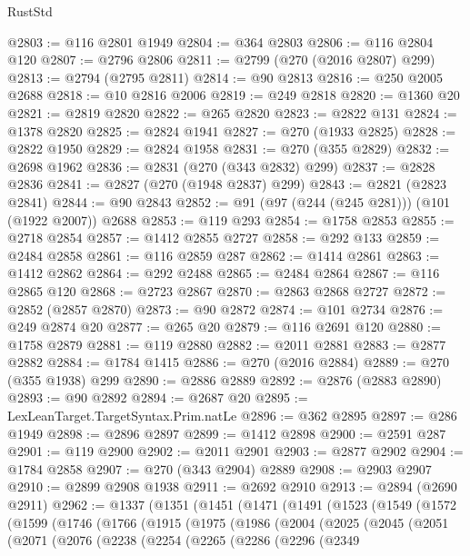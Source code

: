 \begin{lexlean}{RustStd}
\begin{coremodule}
@2803 := @116 @2801 @1949
@2804 := @364 @2803
@2806 := @116 @2804 @120
@2807 := @2796 @2806
@2811 := @2799 (@270 (@2016 @2807) @299)
@2813 := @2794 (@2795 @2811)
@2814 := @90 @2813
@2816 := @250 @2005 @2688
@2818 := @10 @2816 @2006
@2819 := @249 @2818
@2820 := @1360 @20
@2821 := @2819 @2820
@2822 := @265 @2820
@2823 := @2822 @131
@2824 := @1378 @2820
@2825 := @2824 @1941
@2827 := @270 (@1933 @2825)
@2828 := @2822 @1950
@2829 := @2824 @1958
@2831 := @270 (@355 @2829)
@2832 := @2698 @1962
@2836 := @2831 (@270 (@343 @2832) @299)
@2837 := @2828 @2836
@2841 := @2827 (@270 (@1948 @2837) @299)
@2843 := @2821 (@2823 @2841)
@2844 := @90 @2843
@2852 := @91 (@97 (@244 (@245 @281))) (@101 (@1922 @2007)) @2688
@2853 := @119 @293
@2854 := @1758 @2853
@2855 := @2718 @2854
@2857 := @1412 @2855 @2727
@2858 := @292 @133
@2859 := @2484 @2858
@2861 := @116 @2859 @287
@2862 := @1414 @2861
@2863 := @1412 @2862
@2864 := @292 @2488
@2865 := @2484 @2864
@2867 := @116 @2865 @120
@2868 := @2723 @2867
@2870 := @2863 @2868 @2727
@2872 := @2852 (@2857 @2870)
@2873 := @90 @2872
@2874 := @101 @2734
@2876 := @249 @2874 @20
@2877 := @265 @20
@2879 := @116 @2691 @120
@2880 := @1758 @2879
@2881 := @119 @2880
@2882 := @2011 @2881
@2883 := @2877 @2882
@2884 := @1784 @1415
@2886 := @270 (@2016 @2884)
@2889 := @270 (@355 @1938) @299
@2890 := @2886 @2889
@2892 := @2876 (@2883 @2890)
@2893 := @90 @2892
@2894 := @2687 @20
@2895 := LexLeanTarget.TargetSyntax.Prim.natLe
@2896 := @362 @2895
@2897 := @286 @1949
@2898 := @2896 @2897
@2899 := @1412 @2898
@2900 := @2591 @287
@2901 := @119 @2900
@2902 := @2011 @2901
@2903 := @2877 @2902
@2904 := @1784 @2858
@2907 := @270 (@343 @2904) @2889
@2908 := @2903 @2907
@2910 := @2899 @2908 @1938
@2911 := @2692 @2910
@2913 := @2894 (@2690 @2911)
@2962 := @1337
    (@1351
      (@1451
        (@1471
          (@1491
            (@1523
              (@1549
                (@1572
                  (@1599
                    (@1746
                      (@1766
                        (@1915
                          (@1975
                            (@1986
                              (@2004
                                (@2025
                                  (@2045
                                    (@2051
                                      (@2071
                                        (@2076
                                          (@2238
                                            (@2254
                                              (@2265
                                                (@2286
                                                  (@2296
                                                    (@2349

\end{coremodule}
\end{lexlean}
